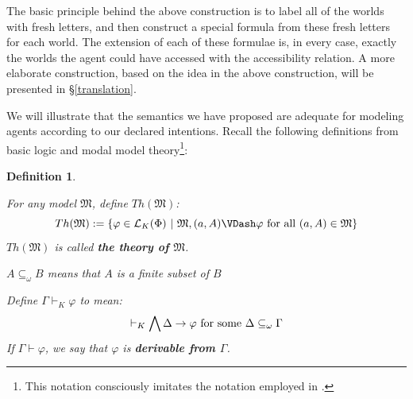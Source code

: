 \documentclass[11pt,titlepage]{report}
\numberwithin{equation}{subsection}
\newtheorem{mydef}[theorem]{Definition}
\renewcommand{\Omega}{\mathfrak{M}}
\renewcommand{\phi}{\varphi}
\begin{document}
The basic principle behind the above construction is to label all of the
worlds with fresh letters, and then construct a special formula from these
fresh letters for each world.  The extension of each of these formulae is, in every case,
exactly the worlds the agent could have accessed with the
accessibility relation.  A more elaborate construction, based on
the idea in the above construction, will be presented in \S\ref{translation}.

We will illustrate that the semantics we have proposed are adequate for
modeling agents according to our declared intentions.
Recall the following definitions from basic logic and modal model
theory\footnote{This notation consciously imitates the notation
  employed in \citep{blackburn_modal_2001}.}:
\begin{mydef}\label{basicdefs}
\begin{mynum}
\item\label{basicdefsI} For any model $\Omega$, define $Th(\Omega)$:
\[Th(\Omega) := \{ \phi \in \mathcal{L}_K(\Phi) \ |\ \Omega, (a,A)
\VDash \phi \textup{ for all $(a,A) \in \Omega$}\}\]
$Th(\Omega)$ is called \textbf{the theory of $\Omega$}.

\item\label{basicdefsII} $A \subseteq_\omega B$ means that $A$ is a finite subset of $B$

\item\label{basicdefsIII} Define $\Gamma \vdash_K \phi$ to mean:
\[ \vdash_K \bigwedge \Delta \to \phi \textup{ for some $\Delta
  \subseteq_\omega \Gamma$} \]
If $\Gamma \vdash \phi$, we say that $\phi$ is \textbf{derivable from
  $\Gamma$}.
\end{mynum}
\end{mydef}
\end{document}
